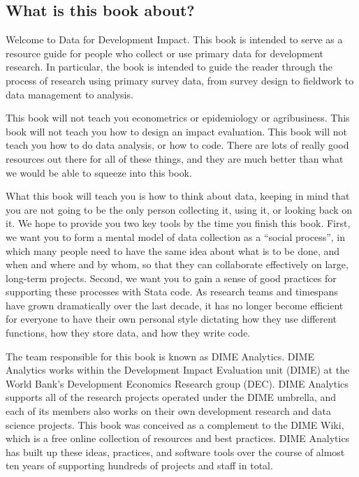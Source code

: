 
\subsection{What is this book about?}

Welcome to Data for Development Impact.
This book is intended to serve as a resource guide
for people who collect or use primary data for development research.
In particular, the book is intended to guide the reader
through the process of research using primary survey data,
from survey design to fieldwork to data management to analysis.

This book will not teach you econometrics or epidemiology or agribusiness.
This book will not teach you how to design an impact evaluation.
This book will not teach you how to do data analysis, or how to code.
There are lots of really good resources out there for all of these things,
and they are much better than what we would be able to squeeze into this book.

What this book will teach you is how to think about data,
keeping in mind that you are not going to be the only person
collecting it, using it, or looking back on it.
We hope to provide you two key tools by the time you finish this book.
First, we want you to form a mental model of data collection as a ``social process'',
in which many people need to have the same idea about what is to be done, and when and where and by whom,
so that they can collaborate effectively on large, long-term projects.
Second, we want you to gain a sense of good practices for supporting these processes with Stata code.
As research teams and timespans have grown dramatically over the last decade,
it has no longer become efficient for everyone to have their own personal style
dictating how they use different functions, how they store data, and how they write code.

The team responsible for this book is known as DIME Analytics. \cite{dimeanalytics}
DIME Analytics works within the Development Impact Evaluation unit (DIME) \cite{dime}
at the World Bank's Development Economics Research group (DEC). \cite{dec}
DIME Analytics supports all of the research projects operated under the DIME umbrella,
and each of its members also works on their own development research and data science projects.
This book was conceived as a complement to the DIME Wiki, \cite{dimewiki}
which is a free online collection of resources and best practices.
DIME Analytics has built up these ideas, practices, and software tools
over the course of almost ten years of supporting hundreds of projects and staff in total.

